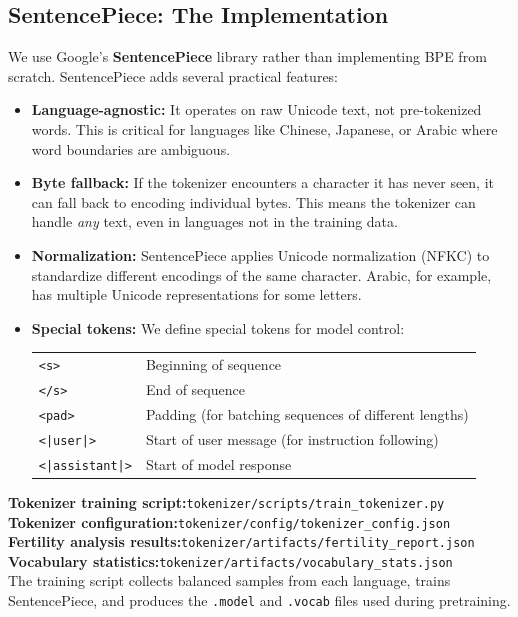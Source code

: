 \documentclass[11pt,a4paper]{article}
\begin{document}
\subsection{SentencePiece: The Implementation}

We use Google's \textbf{SentencePiece} library \citep{kudo2018sentencepiece} rather than implementing BPE from scratch. SentencePiece adds several practical features:

\begin{itemize}
    \item \textbf{Language-agnostic:} It operates on raw Unicode text, not pre-tokenized words. This is critical for languages like Chinese, Japanese, or Arabic where word boundaries are ambiguous.
    
    \item \textbf{Byte fallback:} If the tokenizer encounters a character it has never seen, it can fall back to encoding individual bytes. This means the tokenizer can handle \emph{any} text, even in languages not in the training data.
    
    \item \textbf{Normalization:} SentencePiece applies Unicode normalization (NFKC) to standardize different encodings of the same character. Arabic, for example, has multiple Unicode representations for some letters.
    
    \item \textbf{Special tokens:} We define special tokens for model control:\\[4pt]
    \begin{tabular}{ll}
    \texttt{<s>} & Beginning of sequence \\
    \texttt{</s>} & End of sequence \\
    \texttt{<pad>} & Padding (for batching sequences of different lengths) \\
    \texttt{<|user|>} & Start of user message (for instruction following) \\
    \texttt{<|assistant|>} & Start of model response \\
    \end{tabular}
\end{itemize}

\begin{reporef}
\textbf{Tokenizer training script:}\hfill\texttt{tokenizer/scripts/train\_tokenizer.py}\\
\textbf{Tokenizer configuration:}\hfill\texttt{tokenizer/config/tokenizer\_config.json}\\
\textbf{Fertility analysis results:}\hfill\texttt{tokenizer/artifacts/fertility\_report.json}\\
\textbf{Vocabulary statistics:}\hfill\texttt{tokenizer/artifacts/vocabulary\_stats.json}\\

The training script collects balanced samples from each language, trains SentencePiece, and produces the \texttt{.model} and \texttt{.vocab} files used during pretraining.
\end{reporef}
\end{document}
